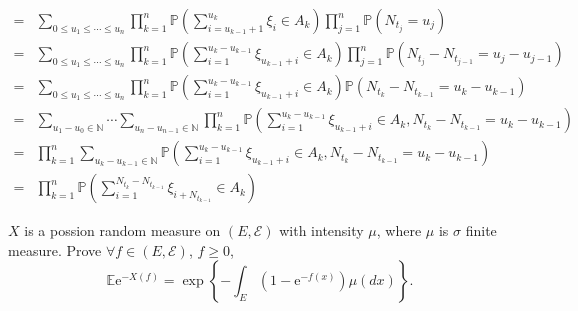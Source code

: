 \documentclass{ctexart}
\begin{document}
\begin{solution}
\begin{enumerate}
\begin{equation}
\begin{aligned}
          = & \sum_{0 \leq u_1\leq \cdots\leq u_n}\prod_{k=1}^{n} \mathbb{P}(\sum_{i=u_{k-1} + 1}^{u_k}\xi_i  \in A_k)\prod_{j=1}^{n} \mathbb{P}(N_{t_{j}}=u_j)                                       \\
          = & \sum_{0 \leq u_1\leq \cdots\leq u_n}\prod_{k=1}^{n} \mathbb{P}(\sum_{i= 1}^{u_k-u_{k-1}}\xi_{u_{k-1}+ i}  \in A_k)\prod_{j=1}^{n} \mathbb{P}(N_{t_{j}}-N_{t_{j-1}}=u_j-u_{j-1})         \\
          = & \sum_{0 \leq u_1\leq \cdots\leq u_n}\prod_{k=1}^{n} \mathbb{P}(\sum_{i= 1}^{u_k-u_{k-1}}\xi_{u_{k-1}+ i}  \in A_k)\mathbb{P}(N_{t_{k}}-N_{t_{k-1}}=u_k-u_{k-1})                         \\
          = & \sum_{u_1-u_{0} \in \mathbb{N}}\cdots \sum_{u_n-u_{n-1} \in \mathbb{N}}\prod_{k=1}^{n} \mathbb{P}(\sum_{i= 1}^{u_k-u_{k-1}}\xi_{u_{k-1}+ i}  \in A_k,N_{t_{k}}-N_{t_{k-1}}=u_k-u_{k-1}) \\
          = & \prod_{k=1}^{n} \sum_{u_k-u_{k-1} \in \mathbb{N}}\mathbb{P}(\sum_{i= 1}^{u_k-u_{k-1}}\xi_{u_{k-1}+ i}  \in A_k,N_{t_{k}}-N_{t_{k-1}}=u_k-u_{k-1})                                       \\
          = & \prod_{k=1}^n\mathbb{P}(\sum_{i=1}^{N_{t_k}-N_{t_{k-1}}}\xi_{i + N_{t_{k-1}}}  \in A_k)
        \end{aligned}
      \end{equation}
  \end{enumerate}

\end{solution}
\begin{problem}\label{pro:2}
  \(X\) is a possion random measure on \((E,\mathscr{E})\) with intensity \(\mu\), where \(\mu\) is \(\sigma\) finite measure.
  Prove \(\forall f \in (E,\mathscr{E})\), \(f \geq 0\), \[
    \mathbb{E}\mathrm{e}^{-X(f)}=\mathrm{\exp}\left\{-\int_{E}(1-\mathrm{e}^{-f(x)})\mu(dx)\right\}.
  \]
\end{problem}
\end{document}
